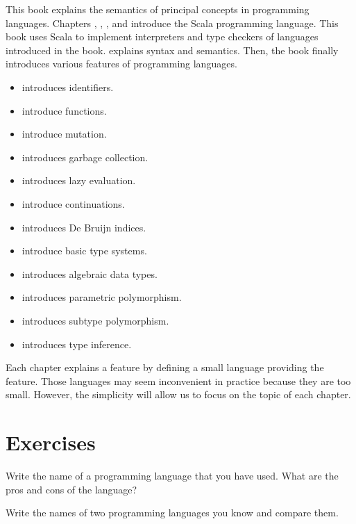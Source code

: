 This book explains the semantics of principal concepts in programming languages.
Chapters , , ,
and  introduce the Scala programming language. This book
uses Scala to implement interpreters and type checkers of languages introduced
in the book.   explains syntax and semantics. Then,
the book finally introduces various features of programming languages.
\begin{itemize}
    \item {} introduces identifiers.
    \item {} introduce functions.
    \item {} introduce mutation.
    \item {} introduces garbage collection.
    \item {} introduces lazy evaluation.
    \item {} introduce continuations.
    \item {} introduces De Bruijn indices.
    \item {} introduce basic type systems.
    \item {} introduces algebraic data types.
    \item {} introduces parametric polymorphism.
    \item {} introduces subtype polymorphism.
    \item {} introduces type inference.
\end{itemize}
Each chapter explains a feature by defining a small language providing the
feature. Those languages may seem inconvenient in practice because they are too small.
However, the simplicity will allow us to focus on the topic of each chapter.

\section{Exercises}

\begin{exercise}

Write the name of a programming language that you have used.
What are the pros and cons of the language?

\end{exercise}

\begin{exercise}

Write the names of two programming languages you know and compare them.

\end{exercise}
